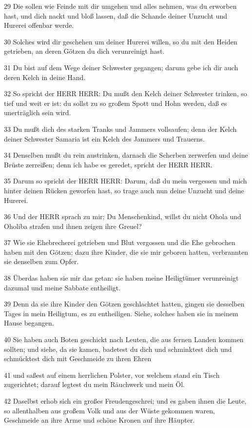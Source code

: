 \par 29 Die sollen wie Feinde mit dir umgehen und alles nehmen, was du erworben hast, und dich nackt und bloß lassen, daß die Schande deiner Unzucht und Hurerei offenbar werde.
\par 30 Solches wird dir geschehen um deiner Hurerei willen, so du mit den Heiden getrieben, an deren Götzen du dich verunreinigt hast.
\par 31 Du bist auf dem Wege deiner Schwester gegangen; darum gebe ich dir auch deren Kelch in deine Hand.
\par 32 So spricht der HERR HERR: Du mußt den Kelch deiner Schwester trinken, so tief und weit er ist: du sollst zu so großem Spott und Hohn werden, daß es unerträglich sein wird.
\par 33 Du mußt dich des starken Tranks und Jammers vollsaufen; denn der Kelch deiner Schwester Samaria ist ein Kelch des Jammers und Trauerns.
\par 34 Denselben mußt du rein austrinken, darnach die Scherben zerwerfen und deine Brüste zerreißen; denn ich habe es geredet, spricht der HERR HERR.
\par 35 Darum so spricht der HERR HERR: Darum, daß du mein vergessen und mich hinter deinen Rücken geworfen hast, so trage auch nun deine Unzucht und deine Hurerei.
\par 36 Und der HERR sprach zu mir; Du Menschenkind, willst du nicht Ohola und Oholiba strafen und ihnen zeigen ihre Greuel?
\par 37 Wie sie Ehebrecherei getrieben und Blut vergossen und die Ehe gebrochen haben mit den Götzen; dazu ihre Kinder, die sie mir geboren hatten, verbrannten sie denselben zum Opfer.
\par 38 Überdas haben sie mir das getan: sie haben meine Heiligtümer verunreinigt dazumal und meine Sabbate entheiligt.
\par 39 Denn da sie ihre Kinder den Götzen geschlachtet hatten, gingen sie desselben Tages in mein Heiligtum, es zu entheiligen. Siehe, solches haben sie in meinem Hause begangen.
\par 40 Sie haben auch Boten geschickt nach Leuten, die aus fernen Landen kommen sollten; und siehe, da sie kamen, badetest du dich und schminktest dich und schmücktest dich mit Geschmeide zu ihren Ehren
\par 41 und saßest auf einem herrlichen Polster, vor welchem stand ein Tisch zugerichtet; darauf legtest du mein Räuchwerk und mein Öl.
\par 42 Daselbst erhob sich ein großes Freudengeschrei; und es gaben ihnen die Leute, so allenthalben aus großem Volk und aus der Wüste gekommen waren, Geschmeide an ihre Arme und schöne Kronen auf ihre Häupter.
